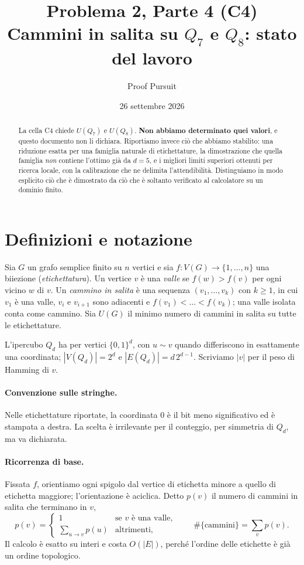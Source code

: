 \documentclass[11pt,a4paper]{article}
\title{Problema 2, Parte 4 (C4)\\[2pt]
\large Cammini in salita su $Q_7$ e $Q_8$: stato del lavoro}
\author{Proof Pursuit}
\date{26 settembre 2026}
\theoremstyle{plain}
\theoremstyle{definition}
\newcommand{\Qd}{Q_d}
\begin{document}
\maketitle

\begin{abstract}
La cella C4 chiede $U(Q_7)$ e $U(Q_8)$. \textbf{Non abbiamo determinato quei
valori}, e questo documento non li dichiara. Riportiamo invece ciò che abbiamo
stabilito: una riduzione esatta per una famiglia naturale di etichettature, la
dimostrazione che quella famiglia \emph{non} contiene l'ottimo già da $d=5$, e i
migliori limiti superiori ottenuti per ricerca locale, con la calibrazione che
ne delimita l'attendibilità. Distinguiamo in modo esplicito ciò che è dimostrato
da ciò che è soltanto verificato al calcolatore su un dominio finito.
\end{abstract}

\section{Definizioni e notazione}

Sia $G$ un grafo semplice finito su $n$ vertici e sia $f\colon V(G)\to\{1,\dots,n\}$
una biiezione (\emph{etichettatura}). Un vertice $v$ è una \emph{valle} se
$f(w)>f(v)$ per ogni vicino $w$ di $v$. Un \emph{cammino in salita} è una
sequenza $(v_1,\dots,v_k)$ con $k\ge1$, in cui $v_1$ è una valle, $v_i$ e
$v_{i+1}$ sono adiacenti e $f(v_1)<\dots<f(v_k)$; una valle isolata conta come
cammino. Sia $U(G)$ il minimo numero di cammini in salita su tutte le
etichettature.

L'ipercubo $\Qd$ ha per vertici $\{0,1\}^d$, con $u\sim v$ quando differiscono
in esattamente una coordinata; $|V(\Qd)|=2^d$ e $|E(\Qd)|=d\,2^{d-1}$. Scriviamo
$|v|$ per il peso di Hamming di $v$.

\paragraph{Convenzione sulle stringhe.} Nelle etichettature riportate, la
coordinata $0$ è il bit meno significativo ed è stampata a destra. La scelta è
irrilevante per il conteggio, per simmetria di $\Qd$, ma va dichiarata.

\paragraph{Ricorrenza di base.} Fissata $f$, orientiamo ogni spigolo dal vertice
di etichetta minore a quello di etichetta maggiore; l'orientazione è aciclica.
Detto $p(v)$ il numero di cammini in salita che terminano in $v$,
\begin{equation}\label{eq:ricorrenza}
p(v)=\begin{cases}1 & \text{se $v$ è una valle},\\[2pt]
\displaystyle\sum_{u\to v}p(u) & \text{altrimenti},\end{cases}
\qquad
\#\{\text{cammini}\}=\sum_{v}p(v).
\end{equation}
Il calcolo è esatto su interi e costa $O(|E|)$, perché l'ordine delle etichette
è già un ordine topologico.
\end{document}
